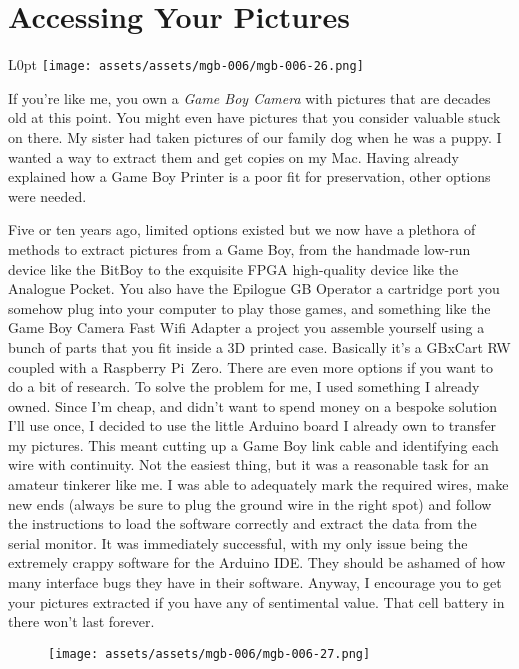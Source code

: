 \documentclass{book}
\begin{document}
\FloatBarrier\needspace{10mm}\section*{Accessing Your Pictures}\nopagebreak[4]

\begin{wrapfigure}{L}{0pt} \texttt{[image: assets/assets/mgb-006/mgb-006-26.png]}\end{wrapfigure}
If you’re like me, you own a \emph{Game Boy Camera} with pictures that are decades old at this point. You might even have pictures that you consider valuable stuck on there. My sister had taken pictures of our family dog when he was a puppy. I wanted a way to extract them and get copies on my Mac. Having already explained how a Game Boy Printer is a poor fit for preservation, other options were needed.

Five or ten years ago, limited options existed but we now have a plethora of methods to extract pictures from a Game Boy, from the handmade low-run device like the BitBoy to the exquisite FPGA high-quality device like the Analogue Pocket. You also have the Epilogue GB Operator a cartridge port you somehow plug into your computer to play those games, and something like the Game Boy Camera Fast Wifi Adapter a project you assemble yourself using a bunch of parts that you fit inside a 3D printed case. Basically it’s a GBxCart RW coupled with a Raspberry Pi Zero. There are even more options if you want to do a bit of research. To solve the problem for me, I used something I already owned. Since I’m cheap, and didn’t want to spend money on a bespoke solution I’ll use once, I decided to use the little Arduino board I already own to transfer my pictures. This meant cutting up a Game Boy link cable and identifying each wire with continuity. Not the easiest thing, but it was a reasonable task for an amateur tinkerer like me. I was able to adequately mark the required wires, make new ends (always be sure to plug the ground wire in the right spot) and follow the instructions to load the software correctly and extract the data from the serial monitor. It was immediately successful, with my only issue being the extremely crappy software for the Arduino IDE. They should be ashamed of how many interface bugs they have in their software. Anyway, I encourage you to get your pictures extracted if you have any of sentimental value. That cell battery in there won’t last forever.

\begin{figure}[hbt]
\vskip 10pt
\centering \texttt{[image: assets/assets/mgb-006/mgb-006-27.png]}
\vskip 6pt
\end{figure}
\end{document}
